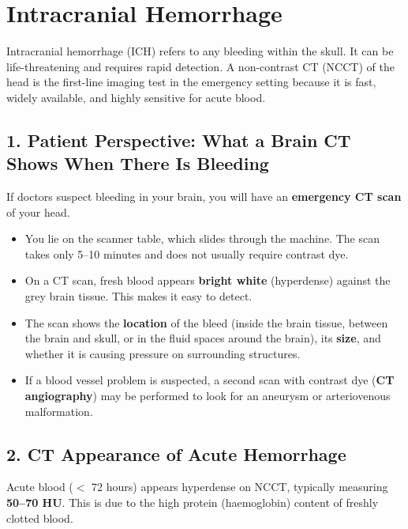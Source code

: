 \chapter{Intracranial Hemorrhage}

\label{ch:ch76_intracranial_hemorrhage}

Intracranial hemorrhage (ICH) refers to any bleeding within the skull. It can be life-threatening and requires rapid detection. A non-contrast CT (NCCT) of the head is the first-line imaging test in the emergency setting because it is fast, widely available, and highly sensitive for acute blood.


\section{1. Patient Perspective: What a Brain CT Shows When There Is Bleeding}

If doctors suspect bleeding in your brain, you will have an \textbf{emergency CT scan} of your head.

\begin{itemize}
  \item You lie on the scanner table, which slides through the machine. The scan takes only 5--10 minutes and does not usually require contrast dye.
  \item On a CT scan, fresh blood appears \textbf{bright white} (hyperdense) against the grey brain tissue. This makes it easy to detect.
  \item The scan shows the \textbf{location} of the bleed (inside the brain tissue, between the brain and skull, or in the fluid spaces around the brain), its \textbf{size}, and whether it is causing pressure on surrounding structures.
  \item If a blood vessel problem is suspected, a second scan with contrast dye (\textbf{CT angiography}) may be performed to look for an aneurysm or arteriovenous malformation.
\end{itemize}


\section{2. CT Appearance of Acute Hemorrhage}

Acute blood ($<$ 72 hours) appears hyperdense on NCCT, typically measuring \textbf{50--70 HU}. This is due to the high protein (haemoglobin) content of freshly clotted blood.

